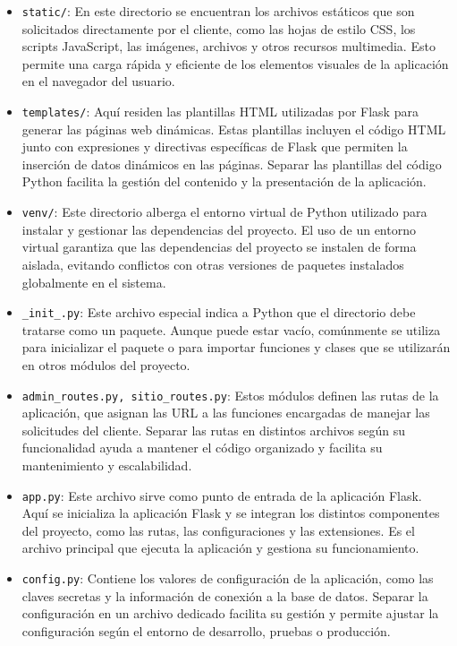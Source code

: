 \documentclass[a4paper, 12pt]{book}
\begin{document}
\begin{itemize}
  \item \texttt{static/}: En este directorio se encuentran los archivos estáticos que son solicitados directamente por el cliente, como las hojas de estilo CSS, los scripts JavaScript, las imágenes, archivos y otros recursos multimedia. Esto permite una carga rápida y eficiente de los elementos visuales de la aplicación en el navegador del usuario.
  \item \texttt{templates/}: Aquí residen las plantillas HTML utilizadas por Flask para generar las páginas web dinámicas. Estas plantillas incluyen el código HTML junto con expresiones y directivas específicas de Flask que permiten la inserción de datos dinámicos en las páginas. Separar las plantillas del código Python facilita la gestión del contenido y la presentación de la aplicación.
  \item \texttt{venv/}: Este directorio alberga el entorno virtual de Python utilizado para instalar y gestionar las dependencias del proyecto. El uso de un entorno virtual garantiza que las dependencias del proyecto se instalen de forma aislada, evitando conflictos con otras versiones de paquetes instalados globalmente en el sistema.
  \item \texttt{\_init\_.py}: Este archivo especial indica a Python que el directorio debe tratarse como un paquete. Aunque puede estar vacío, comúnmente se utiliza para inicializar el paquete o para importar funciones y clases que se utilizarán en otros módulos del proyecto.
  \item \texttt{admin\_routes.py, sitio\_routes.py}: Estos módulos definen las rutas de la aplicación, que asignan las URL a las funciones encargadas de manejar las solicitudes del cliente. Separar las rutas en distintos archivos según su funcionalidad ayuda a mantener el código organizado y facilita su mantenimiento y escalabilidad.
  \item \texttt{app.py}: Este archivo sirve como punto de entrada de la aplicación Flask. Aquí se inicializa la aplicación Flask y se integran los distintos componentes del proyecto, como las rutas, las configuraciones y las extensiones. Es el archivo principal que ejecuta la aplicación y gestiona su funcionamiento.
  \item \texttt{config.py}: Contiene los valores de configuración de la aplicación, como las claves secretas y la información de conexión a la base de datos. Separar la configuración en un archivo dedicado facilita su gestión y permite ajustar la configuración según el entorno de desarrollo, pruebas o producción.

\end{itemize}
\end{document}
